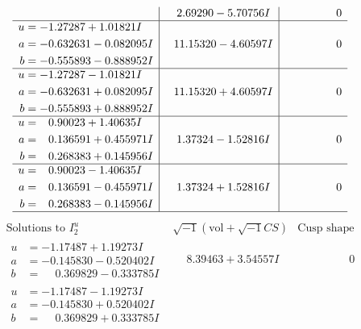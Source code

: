 \documentclass[1p]{elsarticle_modified}
\theoremstyle{definition}
\newcommand{\I}{\sqrt{-1}}
\begin{document}
$$\begin{array}{c|c|c}
 & \phantom{-}2.69290 - 5.70756 I & \phantom{-0.000000 } 0 \\ \hline\begin{aligned}
u &= -1.27287 + 1.01821 I \\
a &= -0.632631 - 0.082095 I \\
b &= -0.555893 - 0.888952 I\end{aligned}
 & \phantom{-}11.15320 - 4.60597 I & \phantom{-0.000000 } 0 \\ \hline\begin{aligned}
u &= -1.27287 - 1.01821 I \\
a &= -0.632631 + 0.082095 I \\
b &= -0.555893 + 0.888952 I\end{aligned}
 & \phantom{-}11.15320 + 4.60597 I & \phantom{-0.000000 } 0 \\ \hline\begin{aligned}
u &= \phantom{-}0.90023 + 1.40635 I \\
a &= \phantom{-}0.136591 + 0.455971 I \\
b &= \phantom{-}0.268383 + 0.145956 I\end{aligned}
 & \phantom{-}1.37324 - 1.52816 I & \phantom{-0.000000 } 0 \\ \hline\begin{aligned}
u &= \phantom{-}0.90023 - 1.40635 I \\
a &= \phantom{-}0.136591 - 0.455971 I \\
b &= \phantom{-}0.268383 - 0.145956 I\end{aligned}
 & \phantom{-}1.37324 + 1.52816 I & \phantom{-0.000000 } 0\\
 \hline 
 \end{array}$$\newpage$$\begin{array}{c|c|c}  
\text{Solutions to }I^u_{2}& \I (\text{vol} + \sqrt{-1}CS) & \text{Cusp shape}\\
 \hline 
\begin{aligned}
u &= -1.17487 + 1.19273 I \\
a &= -0.145830 - 0.520402 I \\
b &= \phantom{-}0.369829 - 0.333785 I\end{aligned}
 & \phantom{-}8.39463 + 3.54557 I & \phantom{-0.000000 } 0 \\ \hline\begin{aligned}
u &= -1.17487 - 1.19273 I \\
a &= -0.145830 + 0.520402 I \\
b &= \phantom{-}0.369829 + 0.333785 I\end{aligned}

\end{array}$$
\end{document}
